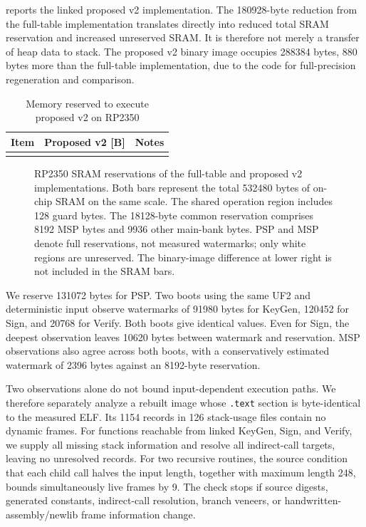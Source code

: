\documentclass[a4paper,10pt]{article}
\theoremstyle{definition}
\theoremstyle{remark}
\begin{document}
 reports the linked proposed v2 implementation. The \num{180928}-byte reduction from the full-table implementation translates directly into reduced total SRAM reservation and increased unreserved SRAM. It is therefore not merely a transfer of heap data to stack. The proposed v2 binary image occupies \num{288384} bytes, \num{880} bytes more than the full-table implementation, due to the code for full-precision regeneration and comparison.

\begin{table}[H]
  \centering
  \caption{Memory reserved to execute proposed v2 on RP2350}
  \label{tab:firmware-memory}
  \small
  \begin{tabular}{@{}lrr@{}}
    \toprule
    Item & Proposed v2 [B] & Notes \\
    \midrule
    \\
    \bottomrule
  \end{tabular}
\end{table}

\begin{figure}[H]
  \centering
  
  \caption{RP2350 SRAM reservations of the full-table and proposed v2 implementations. Both bars represent the total \num{532480} bytes of on-chip SRAM on the same scale. The shared operation region includes 128 guard bytes. The \num{18128}-byte common reservation comprises \num{8192} MSP bytes and \num{9936} other main-bank bytes. PSP and MSP denote full reservations, not measured watermarks; only white regions are unreserved. The binary-image difference at lower right is not included in the SRAM bars.}
  \label{fig:memory-bars}
\end{figure}

We reserve \num{131072} bytes for PSP. Two boots using the same UF2 and deterministic input observe watermarks of \num{91980} bytes for KeyGen, \num{120452} for Sign, and \num{20768} for Verify. Both boots give identical values. Even for Sign, the deepest observation leaves \num{10620} bytes between watermark and reservation. MSP observations also agree across both boots, with a conservatively estimated watermark of \num{2396} bytes against an \num{8192}-byte reservation.

Two observations alone do not bound input-dependent execution paths. We therefore separately analyze a rebuilt image whose \texttt{.text} section is byte-identical to the measured ELF. Its 1154 records in 126 stack-usage files contain no dynamic frames. For functions reachable from linked KeyGen, Sign, and Verify, we supply all missing stack information and resolve all indirect-call targets, leaving no unresolved records. For two recursive routines, the source condition that each child call halves the input length, together with maximum length 248, bounds simultaneously live frames by 9. The check stops if source digests, generated constants, indirect-call resolution, branch veneers, or handwritten-assembly/newlib frame information change.
\end{document}
